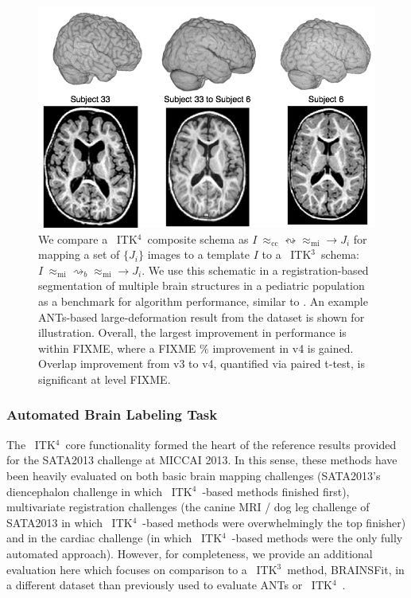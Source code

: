 \documentclass{frontiersSCNS}
\newcommand{\tk}{~ITK$^{\text{4}}$~}
\newcommand{\tkt}{~ITK$^{\text{3}}$~}
\begin{document}
\begin{figure}[t]
\begin{center}
\includegraphics[width=4.5in]{figs/figEval.png}
\caption{We compare a \tk composite schema as $I
~\approx_\text{cc}  \leftrightsquigarrow \approx_\text{mi}  \rightarrow
J_i $ for mapping a set of $\{ J_i \}$ images
to a template $I$ to a \tkt schema:  $I
~\approx_\text{mi} \rightsquigarrow_b    \approx_\text{mi}  \rightarrow
J_i $.  We use this schematic in a registration-based
segmentation of multiple brain structures in a pediatric population as a benchmark
for algorithm performance, similar to \cite{Klein2010}.  An example ANTs-based
large-deformation result from the dataset is shown for illustration.
Overall, the largest
improvement in performance is within FIXME, where a FIXME \%
improvement in v4 is gained.  Overlap improvement from v3 to v4, quantified via
paired t-test, is significant at level FIXME.}
\label{fig:eval}
\end{center}
\end{figure}

\subsubsection{Automated Brain Labeling Task}
The \tk core functionality formed the heart of the reference results
provided for the SATA2013 challenge at MICCAI 2013.  In this sense,
these methods have been heavily evaluated on both basic brain mapping
challenges (SATA2013's diencephalon challenge in which \tk-based
methods finished first), multivariate
registration challenges (the canine MRI / dog leg challenge of
SATA2013 in which \tk-based methods were overwhelmingly the top
finisher) and in the cardiac challenge (in which \tk-based methods
were the only fully automated approach).  However, for completeness,
we provide an additional evaluation here which focuses on comparison
to a \tkt method, BRAINSFit, in a different dataset than previously
used to evaluate ANTs or \tk.
\end{document}
